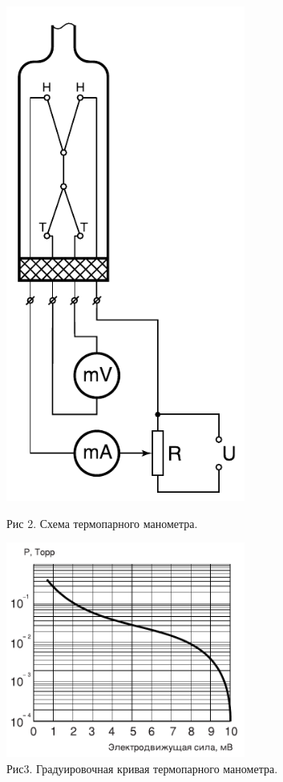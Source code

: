 \documentclass[a4paper]{article}
\begin{document}
    \begin{figure}[h]
    \centering
    \begin{minipage}{0.3\textwidth}
        \centering
        \includegraphics[width=0.7\textwidth]{Pictures/termoparni_monometr}
        \caption{Рис 2. Схема термопарного манометра.}
        \label{ris:termoparni_monometr}
    \end{minipage}\hfill
    \begin{minipage}{0.7\textwidth}
        \centering
        \includegraphics[width=0.7\textwidth]{Pictures/termopara_graduirovka}
        \caption{Рис3. Градуировочная кривая термопарного манометра.}
        \label{ris:termopara_graduirovka}
    \end{minipage}
    \end{figure}
\end{document}
